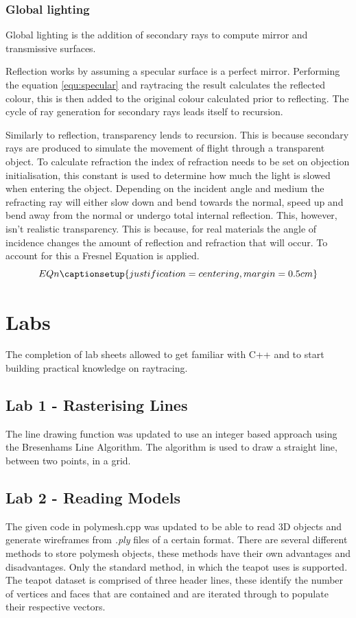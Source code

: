 \documentclass{article}
\begin{document}
\subsubsection{Global lighting}
Global lighting is the addition of secondary rays to compute mirror and transmissive surfaces. 

Reflection works by assuming a specular surface is a perfect mirror. Performing the equation \ref{equ:specular} and raytracing the result calculates the reflected colour, this is then added to the original colour calculated prior to reflecting. The cycle of ray generation for secondary rays leads itself to recursion. 

Similarly to reflection, transparency lends to recursion. This is because secondary rays are produced to simulate the movement of flight through a transparent object. To calculate refraction the index of refraction needs to be set on objection initialisation, this constant is used to determine how much the light is slowed when entering the object. Depending on the incident angle and medium the refracting ray will either slow down and bend towards the normal, speed up and bend away from the normal or undergo total internal reflection. This, however, isn't realistic transparency. This is because, for real materials the angle of incidence changes the amount of reflection and refraction that will occur. To account for this a Fresnel Equation is applied.
\begin{equation}
EQn
\captionsetup{justification=centering,margin=0.5cm}
\label{equ:fresnel}
\end{equation}

\section{Labs}
The completion of lab sheets allowed to get familiar with C++ and to start building practical knowledge on raytracing.
\subsection{Lab 1 - Rasterising Lines}
The line drawing function was updated to use an integer based approach using the Bresenhams Line Algorithm. The algorithm is used to draw a straight line, between two points, in a grid.
\subsection{Lab 2 - Reading Models}
The given code in polymesh.cpp was updated to be able to read 3D objects and generate wireframes from \textit{.ply} files of a certain format. There are several different methods to store polymesh objects, these methods have their own advantages and disadvantages. Only the standard method, in which the teapot uses is supported. The teapot dataset is comprised of three header lines, these identify the number of vertices and faces that are contained and are iterated through to populate their respective vectors.
\end{document}
